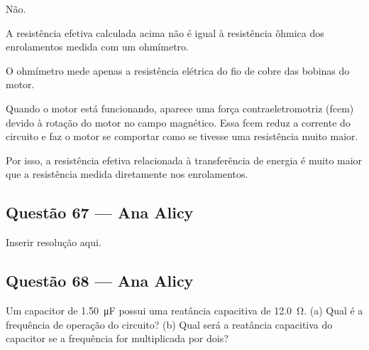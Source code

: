 \documentclass[12pt,a4paper]{article}
\begin{document}
Não.

A resistência efetiva calculada acima não é igual à resistência
ôhmica dos enrolamentos medida com um ohmímetro.

O ohmímetro mede apenas a resistência elétrica do fio de cobre
das bobinas do motor.

Quando o motor está funcionando, aparece uma força
contraeletromotriz (fcem) devido à rotação do motor no campo
magnético. Essa fcem reduz a corrente do circuito e faz o motor
se comportar como se tivesse uma resistência muito maior.

Por isso, a resistência efetiva relacionada à transferência de
energia é muito maior que a resistência medida diretamente nos
enrolamentos.

\subsection{Questão 67 — Ana Alicy}
Inserir resolução aqui.

\subsection{Questão 68 — Ana Alicy}

Um capacitor de \SI{1,50}{\micro\farad} possui uma reatância capacitiva de \SI{12,0}{\ohm}. (a) Qual é a frequência de operação do circuito? (b) Qual será a reatância capacitiva do capacitor se a frequência for multiplicada por dois?

\vspace{0.8cm}
\end{document}
